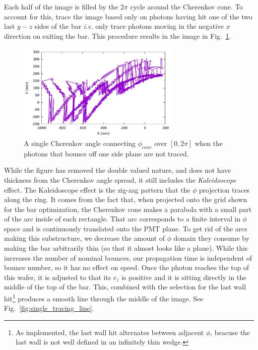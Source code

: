 Each half of the image is filled by the 2$\pi$ cycle around the Cherenkov cone.  To account for this, trace the image based only on photons having hit one of the two last $y-z$ sides of the bar {\em i.e.} only trace photons moving in the negative $x$ direction on exiting the bar.  This procedure results in the image in Fig.~\ref{fig:single_tracing}.

\begin{figure}[!h]
\centering
\includegraphics[width=0.7\textwidth]{pics/phi10k.pdf}
\caption{A single Cherenkov angle connecting $\phi_{cone}$ over $[0,2\pi]$ when the photons that bounce off one side plane are not traced.}
\label{fig:single_tracing}
\end{figure}

While the figure has removed the double valued nature, and does not have thickness from the Cherenkov angle spread, it still includes the {\em Kaleidoscope} effect.  The Kaleidoscope effect is the zig-zag pattern that the $\phi$ projection traces along the ring.  It comes from the fact that, when projected onto the grid shown for the bar optimization, the Cherenkov cone makes a parabola with a small part of the arc inside of each rectangle.  That arc corresponds to a finite interval in $\phi$ space and is continuously translated onto the PMT plane.  To get rid of the arcs making this substructure, we decrease the amount of $\phi$ domain they consume by making the bar arbitrarily thin (so that it almost looks like a plane).  While this increases the number of nominal bounces, our propagation time is independent of bounce number, so it has no effect on speed.  Once the photon reaches the top of this wafer, it is adjusted to that its $v_z$ is positive and it is sitting directly in the middle of the top of the bar.  This, combined with the selection for the last wall hit\footnote{As implemented, the last wall hit alternates between adjacent $\phi$, beacuse the last wall is not well defined in an infinitely thin wedge.} produces a smooth line through the middle of the image.  See Fig.~\ref{fig:single_tracing_line}.

